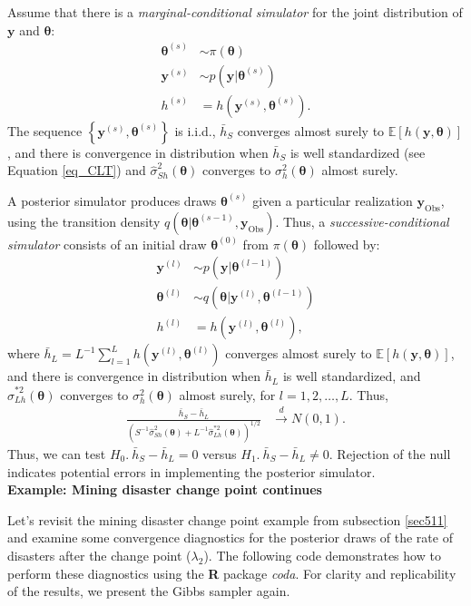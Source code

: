 Assume that there is a \textit{marginal-conditional simulator} for the joint distribution of $\bm{y}$ and $\bm{\theta}$:
\begin{align*}
	\bm{\theta}^{(s)} &\sim \pi(\bm{\theta})\\
	\bm{y}^{(s)} &\sim p(\bm{y}|\bm{\theta}^{(s)})\\
	h^{(s)} &= h(\bm{y}^{(s)},\bm{\theta}^{(s)}). 
\end{align*}
The sequence $\left\{\bm{y}^{(s)},\bm{\theta}^{(s)}\right\}$ is i.i.d., $\bar{h}_S$ converges almost surely to $\mathbb{E}[h(\bm{y},\bm{\theta})]$, and there is convergence in distribution when $\bar{h}_S$ is well standardized (see Equation \ref{eq_CLT}) and $\hat{\sigma}^2_{Sh}(\bm{\theta})$ converges to ${\sigma}^2_h(\bm{\theta})$ almost surely.

A posterior simulator produces draws $\bm{\theta}^{(s)}$ given a particular realization $\bm{y}_{\text{Obs}}$, using the transition density $q(\bm{\theta}|\bm{\theta}^{(s-1)},\bm{y}_{\text{Obs}})$. Thus, a \textit{successive-conditional simulator} consists of an initial draw $\bm{\theta}^{(0)}$ from $\pi(\bm{\theta})$ followed by:
\begin{align*}
	\bm{y}^{(l)} &\sim p(\bm{y}|\bm{\theta}^{(l-1)})\\
	\bm{\theta}^{(l)} &\sim q(\bm{\theta}|\bm{y}^{(l)},\bm{\theta}^{(l-1)})\\
	h^{(l)} &= h(\bm{y}^{(l)},\bm{\theta}^{(l)}), 
\end{align*}
where $\bar{h}_L=L^{-1}\sum_{l=1}^L h(\bm{y}^{(l)},\bm{\theta}^{(l)})$ converges almost surely to $\mathbb{E}[h(\bm{y},\bm{\theta})]$, and there is convergence in distribution when $\bar{h}_L$ is well standardized, and $\hat{\sigma}^{*2}_{Lh}(\bm{\theta})$ converges to ${\sigma}^2_h(\bm{\theta})$ almost surely, for $l=1,2,\dots,L$. Thus,
\begin{align*}
	\frac{\bar{h}_S-\bar{h}_L}{\left(S^{-1}\hat{\sigma}^2_{Sh}(\bm{\theta})+L^{-1}\hat{\sigma}^{*2}_{Lh}(\bm{\theta})\right)^{1/2}} &\stackrel{d}{\rightarrow} N(0,1).
\end{align*}
Thus, we can test $H_0. \ \bar{h}_S-\bar{h}_L=0$ versus $H_1. \ \bar{h}_S-\bar{h}_L\neq 0$. Rejection of the null indicates potential errors in implementing the posterior simulator.\\

\textbf{Example: Mining disaster change point continues}

Let's revisit the mining disaster change point example from subsection \ref{sec511} and examine some convergence diagnostics for the posterior draws of the rate of disasters after the change point ($\lambda_2$). The following code demonstrates how to perform these diagnostics using the \textbf{R} package \textit{coda}. For clarity and replicability of the results, we present the Gibbs sampler again.

